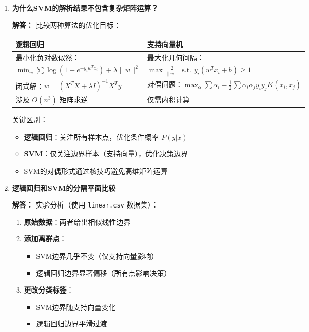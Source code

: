 \documentclass[a4paper,12pt]{book}
\begin{document}
\begin{enumerate}[label=\arabic*.]
    \item \textbf{为什么SVM的解析结果不包含复杂矩阵运算？}
    
    \textbf{解答：} 比较两种算法的优化目标：
    \begin{table}[h]
        \centering
        \begin{tabular}{l|l}
            \toprule
            \textbf{逻辑回归} & \textbf{支持向量机} \\
            \midrule
            最小化负对数似然： & 最大化几何间隔： \\
            $\min_w \sum \log(1+e^{-y_i w^T x_i}) + \lambda \|w\|^2$ & $\max \frac{2}{\|w\|} \text{ s.t. } y_i(w^Tx_i + b) \geq 1$ \\
            闭式解：$w = (X^T X + \lambda I)^{-1} X^T y$ & 对偶问题：$\max_\alpha \sum \alpha_i - \frac{1}{2} \sum \alpha_i \alpha_j y_i y_j K(x_i,x_j)$ \\
            涉及 $O(n^3)$ 矩阵求逆 & 仅需内积计算 \\
            \bottomrule
        \end{tabular}
    \end{table}
    
    关键区别：
    \begin{itemize}
        \item \textbf{逻辑回归}：关注所有样本点，优化条件概率 $P(y|x)$
        \item \textbf{SVM}：仅关注边界样本（支持向量），优化决策边界
        \item SVM的对偶形式通过核技巧避免高维矩阵运算
    \end{itemize}
    
    \item \textbf{逻辑回归和SVM的分隔平面比较}
    
    \textbf{解答：} 实验分析（使用 \texttt{linear.csv} 数据集）：
    
    \begin{enumerate}
        \item \textbf{原始数据}：两者给出相似线性边界
        \item \textbf{添加离群点}：
        \begin{itemize}
            \item SVM边界几乎不变（仅支持向量影响）
            \item 逻辑回归边界显著偏移（所有点影响决策）
        \end{itemize}
        \item \textbf{更改分类标签}：
        \begin{itemize}
            \item SVM边界随支持向量变化
            \item 逻辑回归边界平滑过渡
        \end{itemize}
    \end{enumerate}
    

\end{enumerate}
\end{document}
